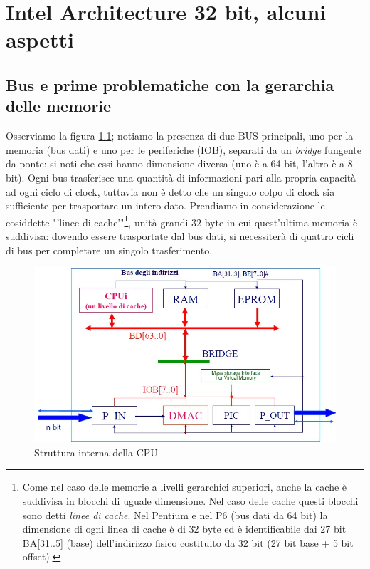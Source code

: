 \chapter{Intel Architecture 32 bit, alcuni aspetti}
\label{cha:ia32}

\section{Bus e prime problematiche con la gerarchia delle memorie}
\label{sec:busMemorie}

Osserviamo la figura \ref{fig:strutturaInternaBus}; notiamo la presenza di due BUS principali, uno per la memoria (bus dati) e uno per le periferiche (IOB), separati da un \textit{bridge} fungente da ponte: si noti che essi hanno dimensione diversa (uno è a 64 bit, l'altro è a 8 bit). Ogni bus trasferisce una quantità di informazioni pari alla propria capacità ad ogni ciclo di clock, tuttavia non è detto che un singolo colpo di clock sia sufficiente per trasportare un intero dato. Prendiamo in considerazione le cosiddette "'linee di cache'"\footnote{Come nel caso delle memorie a livelli gerarchici superiori, anche la cache è suddivisa in blocchi di uguale dimensione. Nel caso delle cache questi blocchi sono detti \textit{linee di cache}. Nel Pentium e nel P6 (bus dati da 64 bit) la dimensione di ogni linea di cache è di 32 byte ed è identificabile dai 27 bit BA[31..5] (base) dell'indirizzo fisico costituito da 32 bit (27 bit base + 5 bit offset).}, unità grandi 32 byte in cui quest'ultima memoria è suddivisa: dovendo essere trasportate dal bus dati, si necessiterà di quattro cicli di bus per completare un singolo trasferimento. 

\begin{figure}[!h]
\centering
\includegraphics[width=0.85\columnwidth]{img/strutturaInternaBus}
\caption{Struttura interna della CPU}
\label{fig:strutturaInternaBus}
\end{figure}

